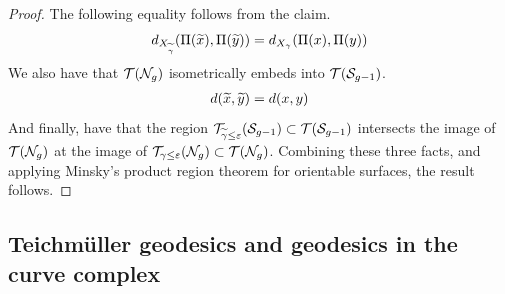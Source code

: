 \documentclass[12pt, reqno]{amsart}
\begin{document}
\begin{proof}
  The following equality follows from the claim.
  \begin{align*}
    d_{X_{\widetilde{\gamma}}}(\Pi(\widetilde{x}), \Pi(\widetilde{y})) = d_{X_{{\gamma}}}(\Pi({x}), \Pi({y}))
  \end{align*}
  We also have that $\mathcal{T}(\mathcal{N}_g)$ isometrically embeds into $\mathcal{T}(\mathcal{S}_{g-1})$.
  \begin{align*}
    d(\widetilde{x}, \widetilde{y}) = d(x, y)
  \end{align*}
  And finally, have that the region $\mathcal{T}_{\widetilde{\gamma} \leq \varepsilon}(\mathcal{S}_{g-1}) \subset \mathcal{T}(\mathcal{S}_{g-1})$ intersects the image of $\mathcal{T}(\mathcal{N}_g)$ at the image of $\mathcal{T}_{\gamma \leq \varepsilon}(\mathcal{N}_g) \subset \mathcal{T}(\mathcal{N}_g)$.
  Combining these three facts, and applying Minsky's product region theorem for orientable surfaces, the result follows.
\end{proof}


\subsection{Teichmüller geodesics and geodesics in the curve complex}
\label{sec:dist-form-teichm}
\end{document}

